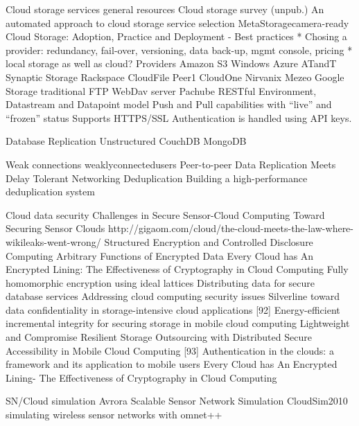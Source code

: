 	Cloud storage services
		general resources
			Cloud storage survey (unpub.)
			An automated approach to cloud storage service selection
			MetaStoragecamera-ready
			Cloud Storage: Adoption, Practice and Deployment
				- Best practices
					* Chosing a provider: redundancy, fail-over, versioning, data back-up, mgmt console, pricing
					* local storage as well as cloud?
		Providers
			Amazon S3
			Windows Azure
			ATandT Synaptic Storage
			Rackspace CloudFile
			Peer1 CloudOne
			Nirvanix
			Mezeo
			Google Storage
			traditional FTP
			WebDav server
			Pachube
				RESTful
				Environment, Datastream and Datapoint model
				Push and Pull capabilities with ``live'' and ``frozen'' status
				Supports HTTPS/SSL
				Authentication is handled using API keys.


	Database Replication
		Unstructured
			CouchDB
			MongoDB

	Weak connections
		weaklyconnectedusers
		Peer-to-peer Data Replication Meets Delay Tolerant Networking
	Deduplication
		Building a high-performance deduplication system
	
	Cloud data security
		Challenges in Secure Sensor-Cloud Computing
		Toward Securing Sensor Clouds
		http://gigaom.com/cloud/the-cloud-meets-the-law-where-wikileaks-went-wrong/
		Structured Encryption and Controlled Disclosure
		Computing Arbitrary Functions of Encrypted Data
		Every Cloud has An Encrypted Lining: The Effectiveness of Cryptography in Cloud Computing	
		Fully homomorphic encryption using ideal lattices
		Distributing data for secure database services
		Addressing cloud computing security issues
		Silverline toward data confidentiality in storage-intensive cloud applications
		[92] Energy-efficient incremental integrity for securing storage in mobile cloud computing
		Lightweight and Compromise Resilient Storage Outsourcing with Distributed Secure Accessibility in Mobile Cloud Computing
		[93] Authentication in the clouds: a framework and its application to mobile users				
		Every Cloud has An Encrypted Lining- The Effectiveness of Cryptography in Cloud Computing
		
	SN/Cloud simulation
		Avrora Scalable Sensor Network Simulation
		CloudSim2010
		simulating wireless sensor networks with omnet++